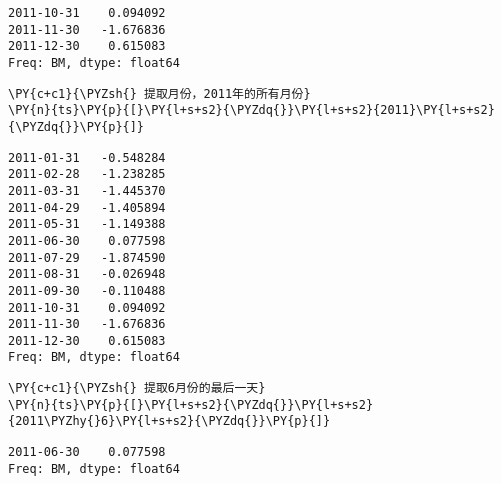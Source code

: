             \begin{tcolorbox}[breakable, size=fbox, boxrule=.5pt, pad at break*=1mm, opacityfill=0]
\begin{Verbatim}[commandchars=\\\{\}]
2011-10-31    0.094092
2011-11-30   -1.676836
2011-12-30    0.615083
Freq: BM, dtype: float64
\end{Verbatim}
\end{tcolorbox}
        
    \begin{tcolorbox}[breakable, size=fbox, boxrule=1pt, pad at break*=1mm,colback=cellbackground, colframe=cellborder]
\begin{Verbatim}[commandchars=\\\{\}]
\PY{c+c1}{\PYZsh{} 提取月份，2011年的所有月份}
\PY{n}{ts}\PY{p}{[}\PY{l+s+s2}{\PYZdq{}}\PY{l+s+s2}{2011}\PY{l+s+s2}{\PYZdq{}}\PY{p}{]}
\end{Verbatim}
\end{tcolorbox}

            \begin{tcolorbox}[breakable, size=fbox, boxrule=.5pt, pad at break*=1mm, opacityfill=0]
\begin{Verbatim}[commandchars=\\\{\}]
2011-01-31   -0.548284
2011-02-28   -1.238285
2011-03-31   -1.445370
2011-04-29   -1.405894
2011-05-31   -1.149388
2011-06-30    0.077598
2011-07-29   -1.874590
2011-08-31   -0.026948
2011-09-30   -0.110488
2011-10-31    0.094092
2011-11-30   -1.676836
2011-12-30    0.615083
Freq: BM, dtype: float64
\end{Verbatim}
\end{tcolorbox}
        
    \begin{tcolorbox}[breakable, size=fbox, boxrule=1pt, pad at break*=1mm,colback=cellbackground, colframe=cellborder]
\begin{Verbatim}[commandchars=\\\{\}]
\PY{c+c1}{\PYZsh{} 提取6月份的最后一天}
\PY{n}{ts}\PY{p}{[}\PY{l+s+s2}{\PYZdq{}}\PY{l+s+s2}{2011\PYZhy{}6}\PY{l+s+s2}{\PYZdq{}}\PY{p}{]}
\end{Verbatim}
\end{tcolorbox}

            \begin{tcolorbox}[breakable, size=fbox, boxrule=.5pt, pad at break*=1mm, opacityfill=0]
\begin{Verbatim}[commandchars=\\\{\}]
2011-06-30    0.077598
Freq: BM, dtype: float64
\end{Verbatim}
\end{tcolorbox}
